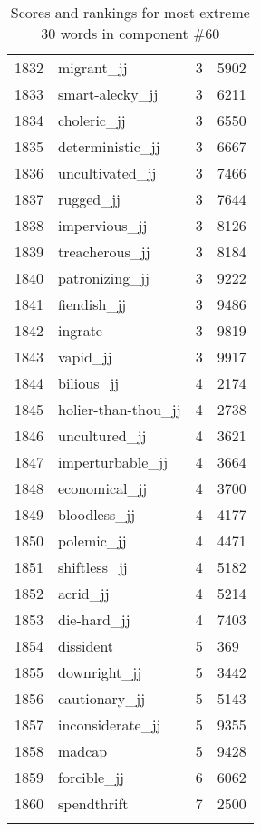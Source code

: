 \begin{longtable}[!htbp]{| rlr@{.}l |}
    1832 & migrant\_jj & 3 & 5902 \\
    1833 & smart-alecky\_jj & 3 & 6211 \\
    1834 & choleric\_jj & 3 & 6550 \\
    1835 & deterministic\_jj & 3 & 6667 \\
    1836 & uncultivated\_jj & 3 & 7466 \\
    1837 & rugged\_jj & 3 & 7644 \\
    1838 & impervious\_jj & 3 & 8126 \\
    1839 & treacherous\_jj & 3 & 8184 \\
    1840 & patronizing\_jj & 3 & 9222 \\
    1841 & fiendish\_jj & 3 & 9486 \\
    1842 & ingrate & 3 & 9819 \\
    1843 & vapid\_jj & 3 & 9917 \\
    1844 & bilious\_jj & 4 & 2174 \\
    1845 & holier-than-thou\_jj & 4 & 2738 \\
    1846 & uncultured\_jj & 4 & 3621 \\
    1847 & imperturbable\_jj & 4 & 3664 \\
    1848 & economical\_jj & 4 & 3700 \\
    1849 & bloodless\_jj & 4 & 4177 \\
    1850 & polemic\_jj & 4 & 4471 \\
    1851 & shiftless\_jj & 4 & 5182 \\
    1852 & acrid\_jj & 4 & 5214 \\
    1853 & die-hard\_jj & 4 & 7403 \\
    1854 & dissident & 5 & 369 \\
    1855 & downright\_jj & 5 & 3442 \\
    1856 & cautionary\_jj & 5 & 5143 \\
    1857 & inconsiderate\_jj & 5 & 9355 \\
    1858 & madcap & 5 & 9428 \\
    1859 & forcible\_jj & 6 & 6062 \\
    1860 & spendthrift & 7 & 2500 \\
    \hline
    \caption{Scores and rankings for most extreme 30 words in component \#60} \\
\end{longtable}

